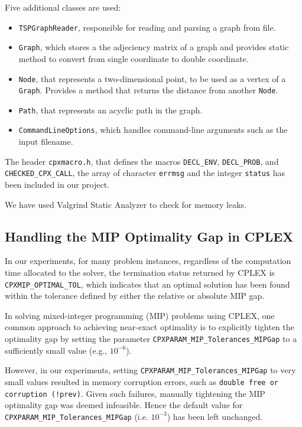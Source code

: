 \documentclass[../main.tex]{subfiles}
\begin{document}
Five additional classes are used:
\begin{itemize}
\item    \texttt{TSPGraphReader}, responsible for reading and parsing a graph from file. 
\item    \texttt{Graph}, which stores a the adjeciency matrix of a graph and provides static method to convert from single coordinate to double coordinate.
\item	 \texttt{Node}, that represents a two-dimensional point, to be used as a vertex of a \texttt{Graph}. Provides a method that returns the distance from another \texttt{Node}.
\item \texttt{Path}, that represents an acyclic path in the graph.
\item    \texttt{CommandLineOptions}, which handles command-line arguments such as the input filename.
\end{itemize}

The header \texttt{cpxmacro.h}, that defines the macros \texttt{DECL\_ENV}, \texttt{DECL\_PROB}, and \texttt{CHECKED\_CPX\_CALL}, the array of character \texttt{errmsg} and the integer \texttt{status} has been included in our project.

We have used  Valgrind Static Analyzer to check for memory leaks.


\subsection{Handling the MIP Optimality Gap in CPLEX}


In our experiments, for many problem instances, regardless of the computation time allocated to the solver, the termination status returned by CPLEX is \texttt{CPXMIP\_OPTIMAL\_TOL}, which indicates that an optimal solution has been found within the tolerance defined by either the relative or absolute MIP gap. 

In solving mixed-integer programming (MIP) problems using CPLEX, one common approach to achieving near-exact optimality is to explicitly tighten the optimality gap by setting the parameter \texttt{CPXPARAM\_MIP\_Tolerances\_MIPGap} to a sufficiently small value (e.g., $10^{-6}$). 

However, in our experiments, setting \texttt{CPXPARAM\_MIP\_Tolerances\_MIPGap} to very small values resulted in memory corruption errors, such as \texttt{double free or corruption (!prev)}. Given such failures, manually tightening the MIP optimality gap was deemed infeasible. Hence the default value for \texttt{CPXPARAM\_MIP\_Tolerances\_MIPGap} (i.e. $10^{-3}$) has been  left unchanged.
\end{document}
